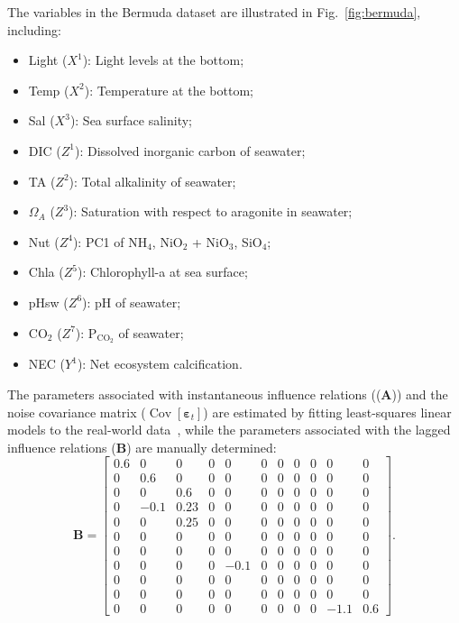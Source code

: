 \documentclass{article}
\theoremstyle{plain}
\theoremstyle{definition}
\theoremstyle{remark}
\def \Fig {Fig.}
\def \A {\mathbf{A}}
\def \B {\mathbf{B}}
\begin{document}
The variables in the Bermuda dataset are illustrated in \Fig~\ref{fig:bermuda}, including:  
\vspace{-0.06in}
\begin{itemize}
  \item Light (\(X^1\)): Light levels at the bottom; 
  \item Temp (\(X^2\)): Temperature at the bottom; 
  \item Sal (\(X^3\)): Sea surface salinity; 
  \item DIC (\(Z^1\)): Dissolved inorganic carbon of seawater; 
  \item TA (\(Z^2\)): Total alkalinity of seawater; 
  \item $\Omega_A$ (\(Z^3\)): Saturation with respect to aragonite in seawater; 
  \item Nut (\(Z^4\)): PC1 of NH$_4$, NiO$_2$ + NiO$_3$, SiO$_4$;
  \item Chla (\(Z^5\)): Chlorophyll-a at sea surface; 
  \item pHsw (\(Z^6\)): pH of seawater; 
  \item CO$_2$ (\(Z^7\)): P$_{\text{CO}_2}$ of seawater; 
  \item NEC (\(Y^1\)): Net ecosystem calcification.
\end{itemize}
The parameters associated with instantaneous influence relations ((\(\A\))) and the noise covariance matrix (\(\operatorname{Cov}[\bm{\varepsilon}_{t}]\)) are estimated by fitting least-squares linear models to the real-world data~\citep{courtney2017environmental,bermuda_dataset}, while the parameters associated with the lagged influence relations (\(\B\)) are manually determined:
\[
\B = \left[
\begin{array}{rrrrrrrrrrr}
 0.6 & 0   & 0    & 0    & 0    & 0    & 0    & 0    & 0    & 0    & 0    \\
 0   & 0.6 & 0    & 0    & 0    & 0    & 0    & 0    & 0    & 0    & 0    \\
 0   & 0   & 0.6  & 0    & 0    & 0    & 0    & 0    & 0    & 0    & 0    \\
 0   & -0.1 & 0.23 & 0    & 0    & 0    & 0    & 0    & 0    & 0    & 0    \\
 0   & 0   & 0.25 & 0    & 0    & 0    & 0    & 0    & 0    & 0    & 0    \\
 0   & 0   & 0    & 0    & 0    & 0    & 0    & 0    & 0    & 0    & 0    \\
 0   & 0   & 0    & 0    & 0    & 0    & 0    & 0    & 0    & 0    & 0    \\
 0   & 0   & 0    & 0    & -0.1 & 0    & 0    & 0    & 0    & 0    & 0    \\
 0   & 0   & 0    & 0    & 0    & 0    & 0    & 0    & 0    & 0    & 0    \\
 0   & 0   & 0    & 0    & 0    & 0    & 0    & 0    & 0    & 0    & 0    \\
 0   & 0   & 0    & 0    & 0    & 0    & 0    & 0    & 0    & -1.1 & 0.6
\end{array}
\right].
\]
\end{document}
